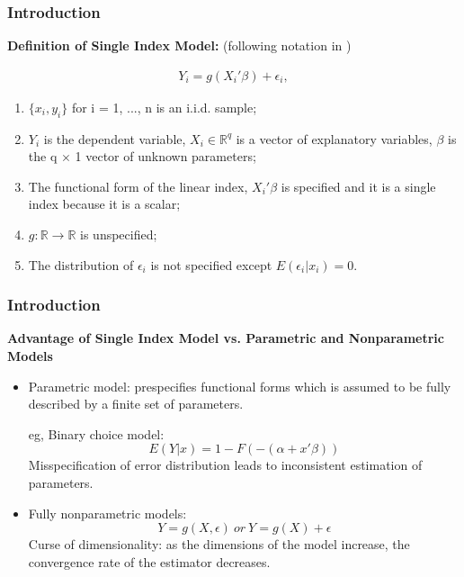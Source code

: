 \documentclass{beamer}
\begin{document}
\begin{frame}[t]
    \frametitle{Introduction}
	 \textbf{Definition of Single Index Model:} 
	 (following notation in \citet{LiRacine07})
 
	 \begin{eqnarray}
		Y_i = g(X_i'\beta) + \epsilon_i,  %
 	 \end{eqnarray}

		\begin{enumerate}
			\item $\{x_i,y_i\}$ for i = 1, ..., n is an i.i.d. sample;
			\item $Y_i$ is the dependent variable, $X_i\in \mathbb{R}^{q}$ is a vector of explanatory variables, $\beta$ is the q $\times$ 1 						vector of unknown parameters; 
			\item The functional form of the linear index, $X_i'\beta$ is specified and it is a single index because it is a scalar;
			\item $g: \mathbb{R} \rightarrow \mathbb{R} $ is unspecified; %
			\item The distribution of $\epsilon_i$ is not specified except $ E(\epsilon_i|x_i) = 0 $.
	   \end{enumerate}

\note{~}      
\end{frame}

\begin{frame}[t]
	\frametitle{Introduction}
	\textbf{Advantage of Single Index Model vs. Parametric and Nonparametric Models}
	\begin{itemize}
	\item Parametric model: prespecifies functional forms which is assumed to be fully described by a finite set of parameters.
			
			eg, Binary choice model: 
			\[E(Y|x) = 1 - F(-(\alpha + x'\beta))\]
			Misspecification of error distribution leads to inconsistent estimation of parameters.
			
	\item Fully nonparametric models: \[Y = g(X, \epsilon)\ or\ Y = g(X) + \epsilon\]
	      Curse of dimensionality: as the dimensions of the model increase, the convergence rate of the estimator decreases.
	
	\end{itemize}
	

\note{~}
\end{frame}
\end{document}
